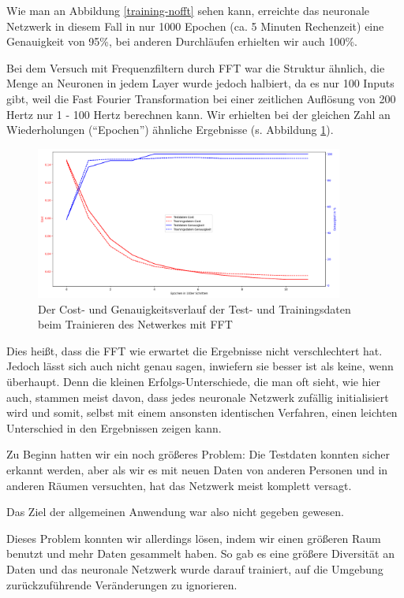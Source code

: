 \documentclass{scrartcl}
\begin{document}
	Wie man an Abbildung \ref{training-nofft} sehen kann, erreichte das neuronale Netzwerk in diesem Fall in nur 1000 Epochen (ca. 5 Minuten Rechenzeit) eine Genauigkeit von 95\%, bei anderen Durchläufen erhielten wir auch 100\%.

	Bei dem Versuch mit Frequenzfiltern durch FFT war die Struktur ähnlich, die Menge an Neuronen in jedem Layer wurde jedoch halbiert, da es nur 100 Inputs gibt, weil die Fast Fourier Transformation bei einer zeitlichen Auflösung von 200 Hertz nur 1 - 100 Hertz berechnen kann. Wir erhielten bei der gleichen Zahl an Wiederholungen (\enquote{Epochen}) ähnliche Ergebnisse (s. Abbildung \ref{training-fft}).

	\begin{figure}[h!]
		\includegraphics[width=0.9\textwidth]{pictures/training-fft2.png}
		\caption{Der Cost- und Genauigkeitsverlauf der Test- und Trainingsdaten beim Trainieren des Netwerkes mit FFT}
		\label{training-fft}
	\end{figure}

	Dies heißt, dass die FFT wie erwartet die Ergebnisse nicht verschlechtert hat. Jedoch lässt sich auch nicht genau sagen, inwiefern sie besser ist als keine, wenn überhaupt. Denn die kleinen Erfolgs-Unterschiede, die man oft sieht, wie hier auch, stammen meist davon, dass jedes neuronale Netzwerk zufällig initialisiert wird und somit, selbst mit einem ansonsten identischen Verfahren, einen leichten Unterschied in den Ergebnissen zeigen kann.

	Zu Beginn hatten wir ein noch größeres Problem: Die Testdaten konnten sicher erkannt werden, aber als wir es mit neuen Daten von anderen Personen und in anderen Räumen versuchten, hat das Netzwerk meist komplett versagt.

	Das Ziel der allgemeinen Anwendung war also nicht gegeben gewesen. 

	Dieses Problem konnten wir allerdings lösen, indem wir einen größeren Raum benutzt und mehr Daten gesammelt haben. So gab es eine größere Diversität an Daten und das neuronale Netzwerk wurde darauf trainiert, auf die Umgebung zurückzuführende Veränderungen zu ignorieren.
\end{document}
